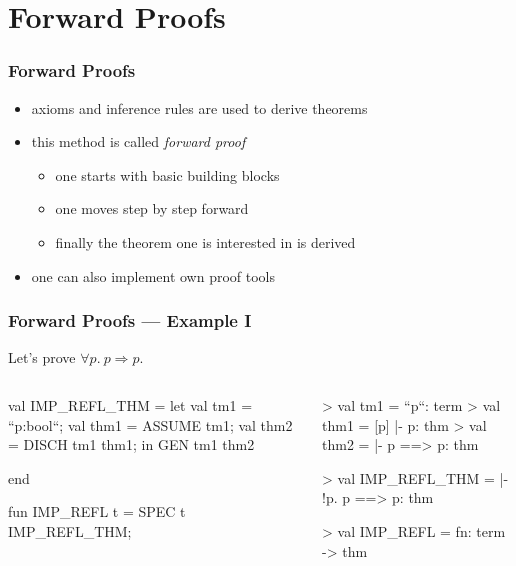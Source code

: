 \section{Forward Proofs}

\begin{frame}
\frametitle{Forward Proofs}

\begin{itemize}
\item axioms and inference rules are used to derive theorems
\item this method is called \emph{forward proof}
\begin{itemize}
\item one starts with basic building blocks
\item one moves step by step forward
\item finally the theorem one is interested in is derived
\end{itemize} 
\item one can also implement own proof tools
\end{itemize}
\end{frame}

\begin{frame}[fragile]
\frametitle{Forward Proofs --- Example I}

Let's prove $\forall{}p.\ p \Longrightarrow p$.
\bigskip

\begin{columns}
\begin{column}{.45\textwidth}
\begin{semiverbatim}
val IMP_REFL_THM = let
  val tm1 = ``p:bool``;
  val thm1 = ASSUME tm1;
  val thm2 = DISCH tm1 thm1;
in 
  GEN tm1 thm2

end

fun IMP_REFL t = 
  SPEC t IMP_REFL_THM;
\end{semiverbatim}
\end{column}
\begin{column}{.45\textwidth}
\begin{semiverbatim}

> val tm1 = ``p``: term
> val thm1 = [p] |- p: thm
> val thm2 = |- p ==> p: thm

> val IMP_REFL_THM = 
    |- !p. p ==> p: thm


> val IMP_REFL = 
    fn: term -> thm
\end{semiverbatim}
\end{column}
\end{columns}
\end{frame}

